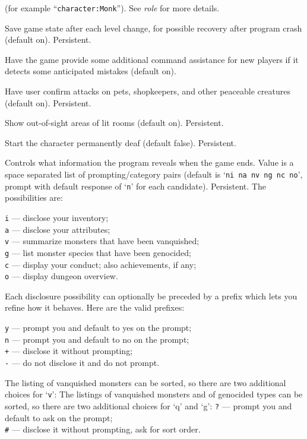 (for example ``{\tt character:Monk}'').  See {\it role\/} for more details.
\item[\ib{checkpoint}]
Save game state after each level change, for possible recovery after
program crash (default on).  Persistent.
\item[\ib{cmdassist}]
Have the game provide some additional command assistance for new
players if it detects some anticipated mistakes (default on).
\item[\ib{confirm}]
Have user confirm attacks on pets, shopkeepers, and other
peaceable creatures (default on).  Persistent.
\item[\ib{dark\verb+_+room}]
Show out-of-sight areas of lit rooms (default on).  Persistent.
\item[\ib{deaf}]
Start the character permanently deaf (default false).  Persistent.
\item[\ib{disclose}]
Controls what information the program reveals when the game ends.
Value is a space separated list of prompting/category pairs
(default is `{\tt ni na nv ng nc no}',
prompt with default response of `{\tt n}' for each candidate).
Persistent.
The possibilities are:

{\tt i} --- disclose your inventory;\\
{\tt a} --- disclose your attributes;\\
{\tt v} --- summarize monsters that have been vanquished;\\
{\tt g} --- list monster species that have been genocided;\\
{\tt c} --- display your conduct; also achievements, if any;\\
{\tt o} --- display dungeon overview.

Each disclosure possibility can optionally be preceded by a prefix which
lets you refine how it behaves.  Here are the valid prefixes:

{\tt y} --- prompt you and default to yes on the prompt;\\
{\tt n} --- prompt you and default to no on the prompt;\\
{\tt +} --- disclose it without prompting;\\
{\tt -} --- do not disclose it and do not prompt.

The listing of vanquished monsters can be sorted,
so there are two additional choices for `{\tt v}':
The listings of vanquished monsters and of genocided types can be sorted,
so there are two additional choices for `q' and `g':
{\tt ?} --- prompt you and default to ask on the prompt;\\
{\tt\#} --- disclose it without prompting, ask for sort order.

